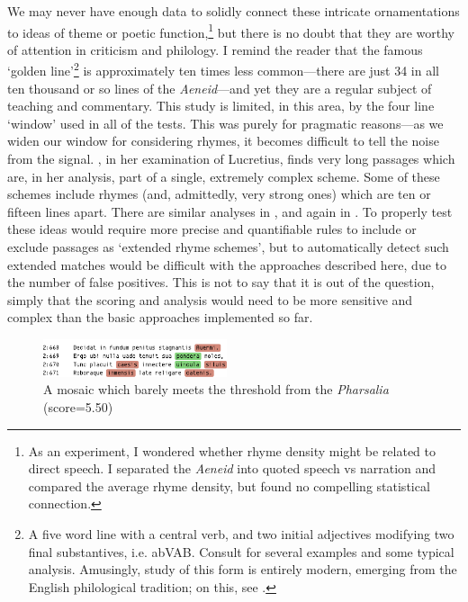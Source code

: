 \documentclass[twocolumn, switch, a4paper]{article} %
\begin{document}
We may never have enough data to solidly connect these intricate
ornamentations to ideas of theme or poetic function,\footnote{
  As an experiment, I wondered whether rhyme density might be related to direct
  speech. I separated the \emph{Aeneid} into quoted speech vs narration and
  compared the average rhyme density, but found no compelling statistical connection.
}
but there is no doubt that they are worthy of attention in
criticism and philology. I remind the reader that the famous `golden line'\footnote{
  A five word line with a central verb, and two initial adjectives modifying
  two final substantives, i.e. abVAB. Consult
   for several examples and some typical
  analysis. Amusingly, study of this form is entirely modern, emerging from the
  English philological tradition; on this, see .
}
is approximately ten times less common---there are just 34 in all ten thousand
or so lines of the \emph{Aeneid}---and yet they are a regular subject of
teaching and commentary. This study is limited, in this area, by the four line
`window' used in all of the tests. This was purely for pragmatic reasons---as
we widen our window for considering rhymes, it becomes difficult to tell the
noise from the signal. \citeauthor{deutsch_1978}, in her examination of
Lucretius, finds very long passages which are, in her analysis, part of a
single, extremely complex scheme. Some of these schemes include rhymes (and,
admittedly, very strong ones) which are ten or fifteen lines apart. There are
similar analyses in , and again in
. To properly test these ideas would
require more precise and quantifiable rules to include or exclude passages as
`extended rhyme schemes', but to automatically detect such extended matches
would be difficult with the approaches described here, due to the number of
false positives. This is not to say that it is out of the question, simply
that the scoring and analysis would need to be more sensitive and complex than
the basic approaches implemented so far.

\begin{figure}
    \caption{A mosaic which barely meets the threshold from the \emph{Pharsalia} (score=5.50)}
    \label{fig:phars_barely}
    \centering
    \includegraphics[width=0.48\textwidth]{phars_barely.pdf}
\end{figure}
\end{document}
